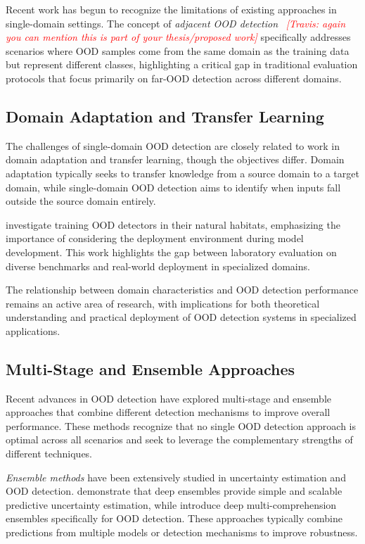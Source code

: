 \documentclass[11pt, oneside]{book}
\theoremstyle{plain}
\theoremstyle{definition}
\theoremstyle{remark}
\newcommand{\travis}[1]{\textcolor{red}{{\it [Travis: #1]}}}
\begin{document}
Recent work has begun to recognize the limitations of existing approaches in single-domain settings. The concept of \emph{adjacent OOD detection}~\citep{yangcan} \travis{again you can mention this is part of your thesis/proposed work} specifically addresses scenarios where OOD samples come from the same domain as the training data but represent different classes, highlighting a critical gap in traditional evaluation protocols that focus primarily on far-OOD detection across different domains.

\subsection{Domain Adaptation and Transfer Learning}

The challenges of single-domain OOD detection are closely related to work in domain adaptation and transfer learning, though the objectives differ. Domain adaptation typically seeks to transfer knowledge from a source domain to a target domain, while single-domain OOD detection aims to identify when inputs fall outside the source domain entirely.

\citet{katz2022training} investigate training OOD detectors in their natural habitats, emphasizing the importance of considering the deployment environment during model development. This work highlights the gap between laboratory evaluation on diverse benchmarks and real-world deployment in specialized domains.

The relationship between domain characteristics and OOD detection performance remains an active area of research, with implications for both theoretical understanding and practical deployment of OOD detection systems in specialized applications.

\subsection{Multi-Stage and Ensemble Approaches}

Recent advances in OOD detection have explored multi-stage and ensemble approaches that combine different detection mechanisms to improve overall performance. These methods recognize that no single OOD detection approach is optimal across all scenarios and seek to leverage the complementary strengths of different techniques.

\emph{Ensemble methods} have been extensively studied in uncertainty estimation and OOD detection. \citet{lakshminarayanan2017simple} demonstrate that deep ensembles provide simple and scalable predictive uncertainty estimation, while \citet{pmlr-v235-xu24ae} introduce deep multi-comprehension ensembles specifically for OOD detection. These approaches typically combine predictions from multiple models or detection mechanisms to improve robustness.
\end{document}
